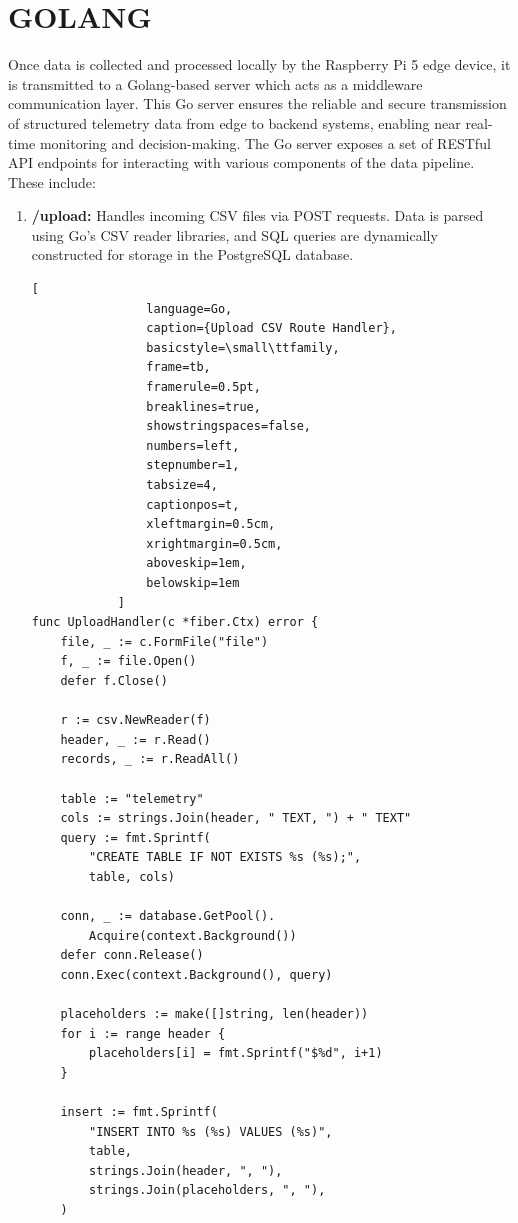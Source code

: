 \section{GOLANG}
    Once data is collected and processed locally by the Raspberry Pi 5 edge device, it is transmitted to a Golang-based server which acts as a middleware communication layer. This Go server ensures the reliable and secure transmission of structured telemetry data from edge to backend systems, enabling near real-time monitoring and decision-making.
    The Go server exposes a set of RESTful API endpoints for interacting with various components of the data pipeline. These include:
    \begin{enumerate}
        \item \textbf{/upload:} 
            Handles incoming CSV files via POST requests. Data is parsed using Go’s CSV reader libraries, and SQL queries are dynamically constructed for storage in the PostgreSQL database.
            \begin{lstlisting}[
                language=Go, 
                caption={Upload CSV Route Handler},
                basicstyle=\small\ttfamily,
                frame=tb,
                framerule=0.5pt,
                breaklines=true,
                showstringspaces=false,
                numbers=left,
                stepnumber=1,
                tabsize=4,
                captionpos=t,
                xleftmargin=0.5cm,
                xrightmargin=0.5cm,
                aboveskip=1em,
                belowskip=1em
            ]
func UploadHandler(c *fiber.Ctx) error {
    file, _ := c.FormFile("file")
    f, _ := file.Open()
    defer f.Close()

    r := csv.NewReader(f)
    header, _ := r.Read()
    records, _ := r.ReadAll()

    table := "telemetry"
    cols := strings.Join(header, " TEXT, ") + " TEXT"
    query := fmt.Sprintf(
        "CREATE TABLE IF NOT EXISTS %s (%s);",
        table, cols)

    conn, _ := database.GetPool().
        Acquire(context.Background())
    defer conn.Release()
    conn.Exec(context.Background(), query)

    placeholders := make([]string, len(header))
    for i := range header {
        placeholders[i] = fmt.Sprintf("$%d", i+1)
    }

    insert := fmt.Sprintf(
        "INSERT INTO %s (%s) VALUES (%s)",
        table,
        strings.Join(header, ", "),
        strings.Join(placeholders, ", "),
    )


\end{lstlisting}
\end{enumerate}
